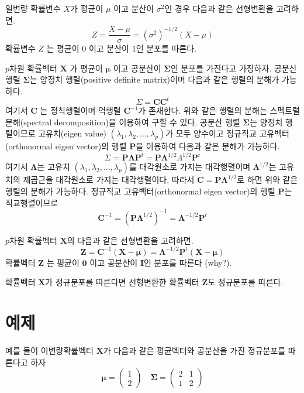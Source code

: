 \documentclass[
]{book}
\theoremstyle{definition}
\theoremstyle{definition}
\theoremstyle{definition}
\theoremstyle{definition}
\theoremstyle{remark}
\begin{document}
일변량 확률변수 \(X\)가 평균이 \(\mu\) 이고 분산이 \(\sigma^2\)인 경우 다음과 같은 선형변환을 고려하면.
\[ Z = \frac{X - \mu}{\sigma} = (\sigma^2)^{-1/2} (X-\mu) \]
확률변수 \(Z\) 는 평균이 \(0\) 이고 분산이 \(1\)인 분포를 따른다.

\(p\)차원 확률벡터 \(\bm X\) 가 평균이 \(\bm \mu\) 이고 공분산이 \(\bm \Sigma\)인 분포를 가진다고 가정하자.
공분산 행렬 \(\bm \Sigma\)는 양정치 행렬(positive definite matrix)이며 다음과 같은 행렬의 분해가 가능하다.
\[ \Sigma = \bm C \bm C^t \]
여기서 \(\bm C\) 는 정칙행렬이며 역행렬 \(\bm C^{-1}\)가 존재한다.
위와 같은 행렬의 분해는 스펙트럴 분해(spectral decomposition)을 이용하여 구할 수 있다. 공분산 행렬 \(\bm \Sigma\)는 양정치 행렬이므로 고유치(eigen value) \((\lambda_1, \lambda_2,\dots, \lambda_p)\)가 모두 양수이고 정규직교 고유벡터(orthonormal eigen vector)의 행렬 \(\bm P\)을 이용하여 다음과 같은 분해가 가능하다.
\[ \Sigma = \bm P \bm \Lambda \bm P^t = \bm P \bm \Lambda^{1/2} \Lambda^{1/2} \bm P^t \]
여기서 \(\bm \Lambda\)는 고유치 \((\lambda_1, \lambda_2,\dots, \lambda_p)\)를 대각원소로 가지는
대각행렬이며 \(\bm \Lambda^{1/2}\)는 고유치의 제곱근을 대각원소로 가지는
대각행렬이다. 따라서 \(\bm C = \bm P \bm \Lambda^{1/2}\)로 하면 위와 같은 행렬의 분해가 가능하다.
정규직교 고유벡터(orthonormal eigen vector)의 행렬 \(\bm P\)는 직교행렬이므로
\[ \bm C^{-1} =  (\bm P \bm \Lambda^{1/2})^{-1} = \bm \Lambda^{-1/2} \bm P^t \]

\(p\)차원 확률벡터 \(\bm X\)의 다음과 같은 선형변환을 고려하면.
\[ \bm Z = \bm C^{-1} ( \bm X- \bm \mu) = \bm \Lambda^{-1/2} \bm P^t ( \bm X- \bm \mu)  \]
확률벡터 \(\bm Z\) 는 평균이 \(\bm 0\) 이고 공분산이 \(\bm I\)인 분포를 따른다 (why?).

확률벡터 \(\bm X\)가 정규분포를 따른다면 선형변환한 확률벡터 \(\bm Z\)도 정규분포를 따른다.

\hypertarget{uxc608uxc81c-1}{%
\section{예제}\label{uxc608uxc81c-1}}

예를 들어 이변량확률벡터 \(\bm X\)가 다음과 같은 평균벡터와 공분산을 가진 정규분포를 따른다고 하자
\begin{equation*}
\bm \mu =
  \begin{pmatrix}
1\\
2
\end{pmatrix}
\quad
\bm \Sigma =
  \begin{pmatrix}
2 & 1\\
1 & 2
\end{pmatrix}
\end{equation*}
\end{document}
